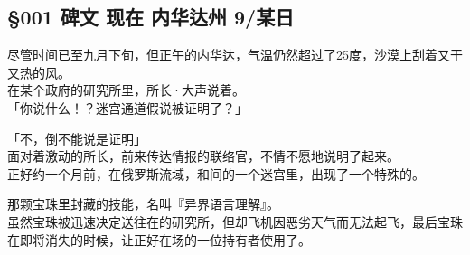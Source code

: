 \subsection{§001 碑文 现在 内华达州 9/某日}

尽管时间已至九月下旬，但正午的内华达，气温仍然超过了25度，沙漠上刮着又干又热的风。\\

在某个政府的研究所里，所长·大声说着。\\

「你说什么！？迷宫通道假说被证明了？」

「不，倒不能说是证明」\\

面对着激动的所长，前来传达情报的联络官，不情不愿地说明了起来。\\

正好约一个月前，在俄罗斯流域，和间的一个迷宫里，出现了一个特殊的。

那颗宝珠里封藏的技能，名叫『异界语言理解』。\\

虽然宝珠被迅速决定送往在的研究所，但却飞机因恶劣天气而无法起飞，最后宝珠在即将消失的时候，让正好在场的一位持有者使用了。\\

